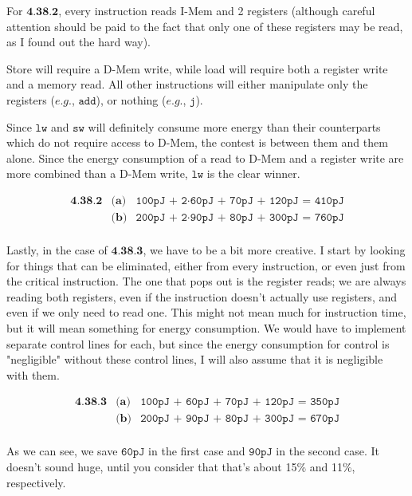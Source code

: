 \documentclass[a4paper]{article}
\begin{document}
For $\textbf{4.38.2}$, every instruction reads I-Mem and 2 registers (although careful attention should be paid to the fact that only one of these registers may be read, as I found out the hard way).

Store will require a D-Mem write, while load will require both a register write and a memory read. All other instructions will either manipulate only the registers ($\textit{e.g.}$, $\texttt{add}$), or nothing ($\textit{e.g.}$, $\texttt{j}$).

Since $\texttt{lw}$ and $\texttt{sw}$ will definitely consume more energy than their counterparts which do not require access to D-Mem, the contest is between them and them alone. Since the energy consumption of a read to D-Mem and a register write are more combined than a D-Mem write, $\texttt{lw}$ is the clear winner.

\begin{equation}
\begin{array}{rll}
\textbf{4.38.2} & \textbf{(a)} & \texttt{100pJ + 2} \cdot \texttt{60pJ + 70pJ + 120pJ = 410pJ} \\[.05in]
& \textbf{(b)} & \texttt{200pJ + 2} \cdot \texttt{90pJ + 80pJ + 300pJ = 760pJ} \\[.05in]
\end{array}
\end{equation}

Lastly, in the case of $\textbf{4.38.3}$, we have to be a bit more creative. I start by looking for things that can be eliminated, either from every instruction, or even just from the critical instruction. The one that pops out is the register reads; we are always reading both registers, even if the instruction doesn't actually use registers, and even if we only need to read one. This might not mean much for instruction time, but it will mean something for energy consumption. We would have to implement separate control lines for each, but since the energy consumption for control is "negligible" without these control lines, I will also assume that it is negligible with them.

\begin{equation}
\begin{array}{rll}
\textbf{4.38.3} & \textbf{(a)} & \texttt{100pJ + 60pJ + 70pJ + 120pJ = 350pJ} \\[.05in]
& \textbf{(b)} & \texttt{200pJ + 90pJ + 80pJ + 300pJ = 670pJ} \\[.05in]
\end{array}
\end{equation}

As we can see, we save $\texttt{60pJ}$ in the first case and $\texttt{90pJ}$ in the second case. It doesn't sound huge, until you consider that that's about 15\% and 11\%, respectively.
\end{document}
